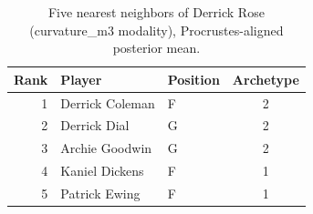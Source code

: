 \begin{table}[htbp]
  \centering\small
  \begin{tabular}{rllc}
    \toprule
    Rank & Player & Position & Archetype \\
    \midrule
    1 & Derrick Coleman & F & 2 \\
    2 & Derrick Dial & G & 2 \\
    3 & Archie Goodwin & G & 2 \\
    4 & Kaniel Dickens & F & 1 \\
    5 & Patrick Ewing & F & 1 \\
    \bottomrule
  \end{tabular}
  \caption{Five nearest neighbors of Derrick Rose (curvature_m3 modality), Procrustes-aligned posterior mean.}
  \label{tab:Derrick_Rose_neighbors_curvature_m3}
\end{table}

